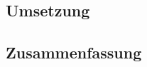 \begin{spacing}{1}
	\chapter{Umsetzung}\label{chapter:implementation}
\end{spacing}


\begin{spacing}{1}
	\chapter{Zusammenfassung}
\end{spacing}


\newpage
{}
\setcounter{page}{\value{RPages}}

\glsnogroupskiptrue
\printglossary[title=Glossar,toctitle=Glossar] %
\listoffigures
\listoftables
\lstlistoflistings

